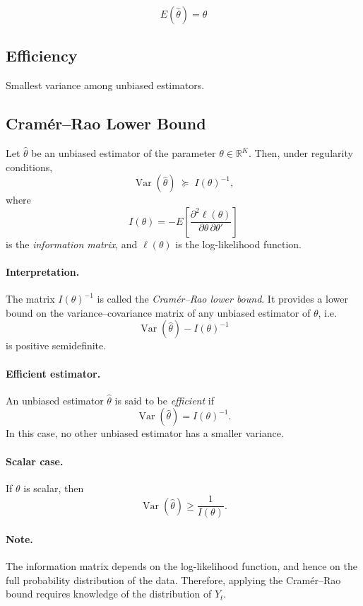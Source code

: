 \[
E(\hat{\theta}) = \theta
\]

\subsection{Efficiency}

Smallest variance among unbiased estimators.

\subsection{Cram\'er--Rao Lower Bound}

Let $\hat{\theta}$ be an unbiased estimator of the parameter $\theta \in \mathbb{R}^K$.
Then, under regularity conditions,
\[
\operatorname{Var}(\hat{\theta}) \;\succeq\; I(\theta)^{-1},
\]
where
\[
I(\theta)
=
- E\!\left[\frac{\partial^2 \ell(\theta)}{\partial \theta \,\partial \theta'}\right]
\]
is the \emph{information matrix}, and $\ell(\theta)$ is the log-likelihood function.

\paragraph{Interpretation.}
The matrix $I(\theta)^{-1}$ is called the \emph{Cram\'er--Rao lower bound}.
It provides a lower bound on the variance--covariance matrix of any unbiased estimator of $\theta$, i.e.
\[
\operatorname{Var}(\hat{\theta}) - I(\theta)^{-1}
\]
is positive semidefinite.

\paragraph{Efficient estimator.}
An unbiased estimator $\hat{\theta}$ is said to be \emph{efficient} if
\[
\operatorname{Var}(\hat{\theta}) = I(\theta)^{-1}.
\]
In this case, no other unbiased estimator has a smaller variance.

\paragraph{Scalar case.}
If $\theta$ is scalar, then
\[
\operatorname{Var}(\hat{\theta}) \ge \frac{1}{I(\theta)}.
\]

\paragraph{Note.}
The information matrix depends on the log-likelihood function, and hence on the full probability distribution of the data.
Therefore, applying the Cram\'er--Rao bound requires knowledge of the distribution of $Y_t$.


